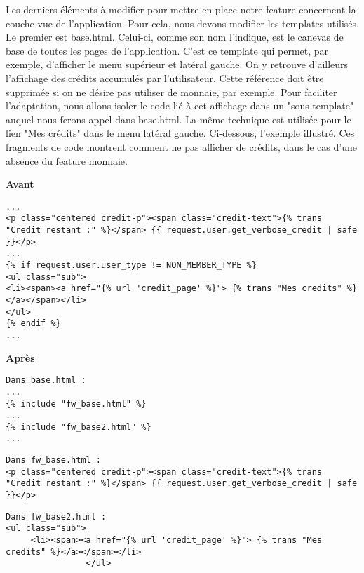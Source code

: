 Les derniers éléments à modifier pour mettre en place notre feature concernent la couche vue de l'application.  Pour cela,  nous devons modifier les templates utilisés. Le premier est base.html.  Celui-ci,  comme son nom l'indique,  est le canevas de base de toutes les pages de l'application.  C'est ce template qui permet,  par exemple,  d'afficher le menu supérieur et latéral gauche.  On y retrouve d'ailleurs l'affichage des crédits accumulés par l'utilisateur.  Cette référence doit être supprimée si on ne désire pas utiliser de monnaie,  par exemple.  Pour faciliter l'adaptation,  nous allons isoler le code lié à cet affichage dans un "sous-template" auquel nous ferons appel dans base.html.  La même technique est utilisée pour le lien "Mes crédits" dans le menu latéral gauche.  Ci-dessous,  l'exemple illustré.  Ces fragments de code montrent comment ne pas afficher de crédits,  dans le cas d'une absence du feature monnaie.  

\begin{minipage}{.5\textwidth}
\begin{center} \textbf{Avant}\end{center}
\begin{lstlisting}
...
<p class="centered credit-p"><span class="credit-text">{% trans "Credit restant :" %}</span> {{ request.user.get_verbose_credit | safe }}</p>
...
{% if request.user.user_type != NON_MEMBER_TYPE %}
<ul class="sub">
<li><span><a href="{% url 'credit_page' %}"> {% trans "Mes credits" %}</a></span></li>
</ul>
{% endif %}
...
\end{lstlisting} 
\end{minipage}
\hspace{0.3cm}
\begin{minipage}{.5\textwidth}
\begin{center} \textbf{Après}\end{center}
\begin{lstlisting}
Dans base.html :
...
{% include "fw_base.html" %}
...
{% include "fw_base2.html" %}
...
\end{lstlisting} 

\begin{lstlisting}
Dans fw_base.html : 
<p class="centered credit-p"><span class="credit-text">{% trans "Credit restant :" %}</span> {{ request.user.get_verbose_credit | safe }}</p>
\end{lstlisting} 

\begin{lstlisting}
Dans fw_base2.html : 
<ul class="sub">
     <li><span><a href="{% url 'credit_page' %}"> {% trans "Mes credits" %}</a></span></li>
                </ul>

\end{lstlisting} 
\end{minipage}

